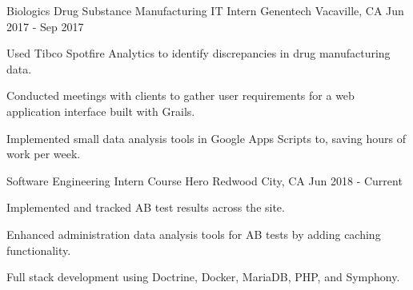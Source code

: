 

\begin{cventries}

  \cventry
  {Biologics Drug Substance Manufacturing IT Intern} %
  {Genentech} %
  {Vacaville, CA} %
  {Jun 2017 - Sep 2017} %
  {
  \begin{cvitems} %
    \item {Used Tibco Spotfire Analytics to identify discrepancies in drug manufacturing data.}
    \item {Conducted meetings with clients to gather user requirements for a web application interface built with Grails.}
    \item {Implemented small data analysis tools in Google Apps Scripts to, saving hours of work per week.}
  \end{cvitems}
  }

  \cventry
  {Software Engineering Intern}
  {Course Hero}
  {Redwood City, CA}
  {Jun 2018 - Current}
  {
  \begin{cvitems}
    \item {Implemented and tracked AB test results across the site.}
    \item {Enhanced administration data analysis tools for AB tests by adding caching functionality.}
    \item {Full stack development using Doctrine, Docker, MariaDB, PHP, and Symphony.}
  \end{cvitems}
  }
\end{cventries}
